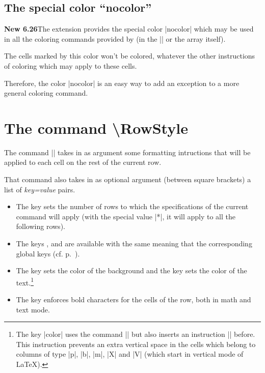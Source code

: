\documentclass[dvipsnames]{article}%
\begin{document}
\subsection{The special color ``nocolor''}


\colorbox{yellow!50}{\textbf{New 6.26}}\enskip The extension 
provides the special color |nocolor| which may be used in all the coloring
commands provided by  (in the |\CodeBefore| or the array
itself).

The cells marked by this color won't be colored, whatever the other instructions
of coloring which may apply to these cells.

Therefore, the color |nocolor| is an easy way to add an exception to a more
general coloring command.

\section{The command \textbackslash RowStyle}

\label{RowStyle}


The command |\RowStyle| takes in as argument some formatting intructions that
will be applied to each cell on the rest of the current row.

\medskip
That command also takes in as optional argument (between square brackets)
a list of \textsl{key=value} pairs. 
\begin{itemize}
\item {} The key  sets
the number of rows to which the specifications of the current command will
apply (with the special value |*|, it will apply to all the following rows).
\item The keys ,  and
 are available with the same meaning that the
corresponding global keys (cf. p.~\pageref{cell-space}).
\item {}
The key  sets the color of the background and the key
 sets the color of the text.\footnote{The key |color| uses the command
|\color| but also inserts an instruction |\leavevmode| before. This
instruction prevents an extra vertical space in the cells which belong to
columns of type |p|, |b|, |m|, |X| and |V| (which start in
vertical mode of LaTeX).}
\item {} The key
 enforces bold characters for the cells of the row, both in
math and text mode. 
\end{itemize}
\end{document}
